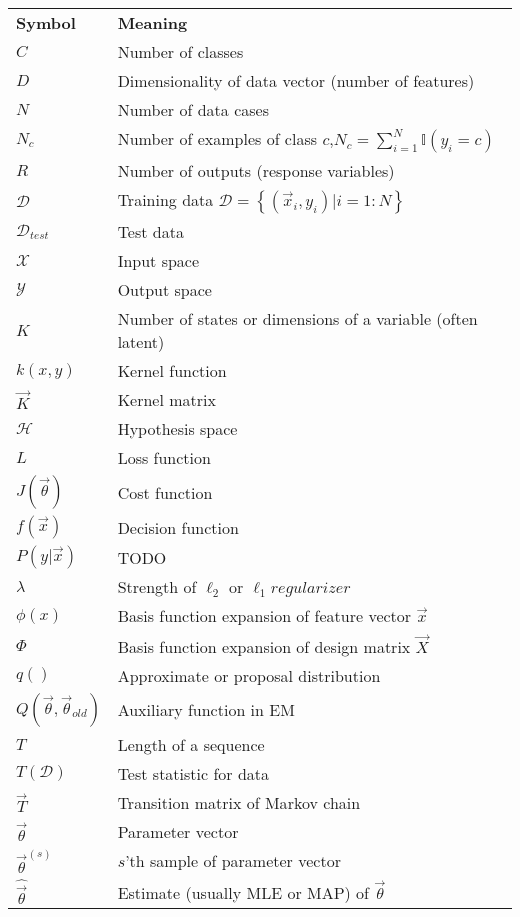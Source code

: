 \documentclass[a4paper,11pt]{article}
\begin{document}
\begin{longtable}{ll}
	\hline\noalign{\smallskip}
	\textbf{Symbol} & \textbf{Meaning} \\
	\noalign{\smallskip}\hline\noalign{\smallskip}
	$C$ & Number of classes\\
	$D$ & Dimensionality of data vector (number of features)\\
	$N$ & Number of data cases\\
	$N_c$ & Number of examples of class $c$,$N_c=\sum_{i=1}^{N}\mathbb{I}(y_i=c)$\\
	$R$ & Number of outputs (response variables)\\
	$\mathcal{D}$ & Training data $\mathcal{D}=\left\{(\vec{x}_i,y_i) | i=1:N\right\}$\\
	$\mathcal{D}_{test}$ & Test data\\
	$\mathcal{X}$ & Input space\\
	$\mathcal{Y}$ & Output space\\
	$K$ & Number of states or dimensions of a variable (often latent)\\
	$k(x,y)$ & Kernel function\\
	$\vec{K}$ & Kernel matrix\\
	$\mathcal{H}$ & Hypothesis space\\
	$L$ & Loss function \\
	$J(\vec{\theta})$ & Cost function\\
	$f(\vec{x})$ & Decision function\\
	$P(y|\vec{x})$ & TODO\\
	$\lambda$ & Strength of $\ell_2$ or $\ell_1 regularizer$\\
	$\phi(x)$ & Basis function expansion of feature vector $\vec{x}$\\
	$\Phi$ & Basis function expansion of design matrix $\vec{X}$\\
	$q()$ & Approximate or proposal distribution\\
	$Q(\vec{\theta},\vec{\theta}_{old})$ & Auxiliary function in EM\\
	$T$ & Length of a sequence\\
	$T(\mathcal{D})$ & Test statistic for data\\
	$\vec{T}$ & Transition matrix of Markov chain\\
	$\vec{\theta}$ & Parameter vector\\
	$\vec{\theta}^{(s)}$ & $s$'th sample of parameter vector\\
	$\hat{\vec{\theta}}$ & Estimate (usually MLE or MAP) of $\vec{\theta}$\\

\end{longtable}
\end{document}
